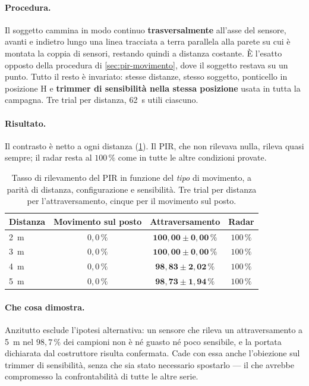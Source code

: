 \paragraph{Procedura.} Il soggetto cammina in modo continuo \textbf{trasversalmente}
all'asse del sensore, avanti e indietro lungo una linea tracciata a terra parallela
alla parete su cui è montata la coppia di sensori, restando quindi a distanza
costante. È l'esatto opposto della procedura di \cref{sec:pir-movimento}, dove il
soggetto restava su un punto. Tutto il resto è invariato: stesse distanze, stesso
soggetto, ponticello in posizione H e \textbf{trimmer di sensibilità nella stessa
posizione} usata in tutta la campagna. Tre trial per distanza, 62~s utili ciascuno.

\paragraph{Risultato.} Il contrasto è netto a ogni distanza
(\cref{tab:attraversamento}). Il PIR, che non rilevava nulla, rileva quasi sempre; il
radar resta al $100\,\%$ come in tutte le altre condizioni provate.

\begin{table}[htbp]
\centering
\caption{Tasso di rilevamento del PIR in funzione del \emph{tipo} di movimento, a
parità di distanza, configurazione e sensibilità. Tre trial per distanza per
l'attraversamento, cinque per il movimento sul posto.}
\label{tab:attraversamento}
\small
\begin{tabular}{@{}lccc@{}}
\toprule
Distanza & Movimento sul posto & Attraversamento & Radar \\
\midrule
2~m & $0{,}0\,\%$ & $\mathbf{100{,}00 \pm 0{,}00\,\%}$ & $100\,\%$ \\
3~m & $0{,}0\,\%$ & $\mathbf{100{,}00 \pm 0{,}00\,\%}$ & $100\,\%$ \\
4~m & $0{,}0\,\%$ & $\mathbf{98{,}83 \pm 2{,}02\,\%}$ & $100\,\%$ \\
5~m & $0{,}0\,\%$ & $\mathbf{98{,}73 \pm 1{,}94\,\%}$ & $100\,\%$ \\
\bottomrule
\end{tabular}
\end{table}

\paragraph{Che cosa dimostra.} Anzitutto esclude l'ipotesi alternativa: un sensore che
rileva un attraversamento a 5~m nel $98{,}7\,\%$ dei campioni non è né guasto né poco
sensibile, e la portata dichiarata dal costruttore risulta confermata. Cade con essa
anche l'obiezione sul trimmer di sensibilità, senza che sia stato necessario spostarlo
--- il che avrebbe compromesso la confrontabilità di tutte le altre serie.

